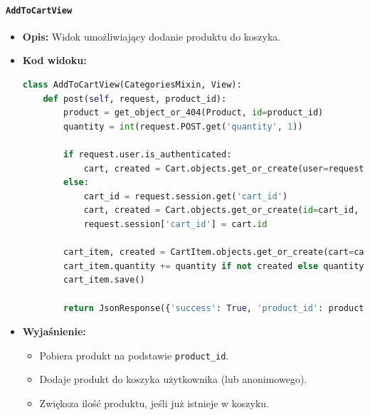 \documentclass[12pt,a4paper,oneside]{article}
\theoremstyle{definition}
\numberwithin{equation}{section}
\begin{document}
\paragraph{\texttt{AddToCartView}}
\begin{itemize}
    \item \textbf{Opis:} Widok umożliwiający dodanie produktu do koszyka.
    \item \textbf{Kod widoku:}
\begin{lstlisting}[language=Python, caption=Kod widoku AddToCartView]
class AddToCartView(CategoriesMixin, View):
    def post(self, request, product_id):
        product = get_object_or_404(Product, id=product_id)
        quantity = int(request.POST.get('quantity', 1))

        if request.user.is_authenticated:
            cart, created = Cart.objects.get_or_create(user=request.user)
        else:
            cart_id = request.session.get('cart_id')
            cart, created = Cart.objects.get_or_create(id=cart_id, user=None) if cart_id else Cart.objects.create(user=None)
            request.session['cart_id'] = cart.id

        cart_item, created = CartItem.objects.get_or_create(cart=cart, product=product)
        cart_item.quantity += quantity if not created else quantity
        cart_item.save()

        return JsonResponse({'success': True, 'product_id': product_id, 'quantity': cart_item.quantity})
\end{lstlisting}

    \item \textbf{Wyjaśnienie:}
    \begin{itemize}
        \item Pobiera produkt na podstawie \texttt{product\_id}.
        \item Dodaje produkt do koszyka użytkownika (lub anonimowego).
        \item Zwiększa ilość produktu, jeśli już istnieje w koszyku.
    \end{itemize}
\end{itemize}
\end{document}
